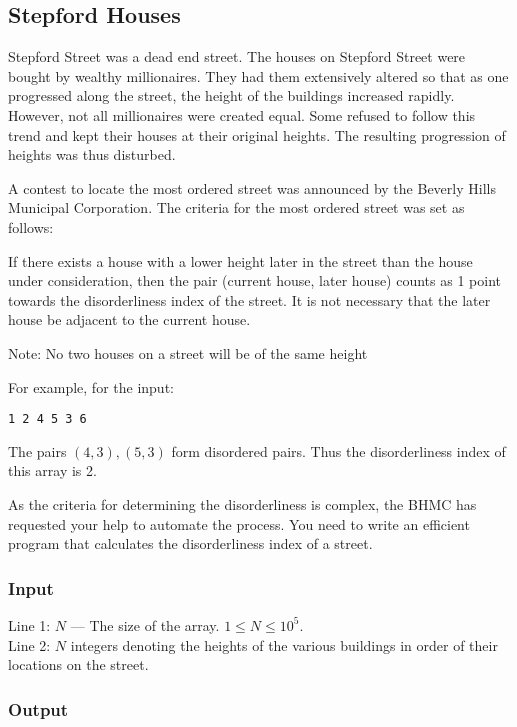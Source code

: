 \subsection{Stepford Houses}


Stepford Street was a dead end street. The houses on Stepford Street were bought by wealthy millionaires. They had them extensively altered so that as one progressed along the street, the height of the buildings increased rapidly. However, not all millionaires were created equal. Some refused to follow this trend and kept their houses at their original heights. The resulting progression of heights was thus disturbed.

A contest to locate the most ordered street was announced by the Beverly Hills Municipal Corporation. The criteria for the most ordered street was set as follows:

If there exists a house with a lower height later in the street than the house under consideration, then the pair (current house, later house) counts as 1 point towards the disorderliness index of the street. It is not necessary that the later house be adjacent to the current house.

Note: No two houses on a street will be of the same height

For example, for the input:
\begin{verbatim}
1 2 4 5 3 6
\end{verbatim}

The pairs $(4,3), (5,3)$ form disordered pairs. Thus the disorderliness index of this array is 2.

As the criteria for determining the disorderliness is complex, the BHMC has requested your help to automate the process. You need to write an efficient program that calculates the disorderliness index of a street.

\subsubsection*{Input}

Line 1: $N$ --- The size of the array. $1 \leq N \leq 10^5$.\\
Line 2: $N$ integers denoting the heights of the various buildings in order of their locations on the street.

\subsubsection*{Output}

